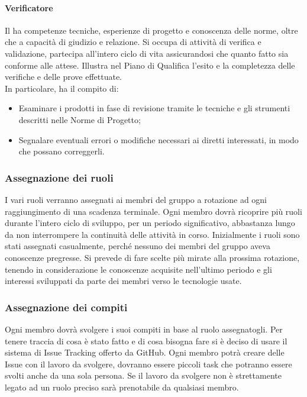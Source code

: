 \documentclass[../norme_di_progetto.tex]{subfiles}
\begin{document}
        \paragraph{Verificatore}
        Il \textbf{} ha competenze tecniche, esperienze di progetto e conoscenza delle norme, oltre che a capacità di giudizio e relazione. Si occupa di attività di verifica e validazione, partecipa all'intero ciclo di vita assicurandosi che quanto fatto sia conforme alle attese. Illustra nel Piano di Qualifica l'esito e la completezza delle verifiche e delle prove effettuate.\\
        In particolare, ha il compito di:
        \begin{itemize}
            \item Esaminare i prodotti in fase di revisione tramite le tecniche e gli strumenti descritti nelle Norme di Progetto;
            \item Segnalare eventuali errori o modifiche necessari ai diretti interessati, in modo che possano correggerli.
        \end{itemize}

    \subsubsection{Assegnazione dei ruoli}
    I vari ruoli verranno assegnati ai membri del gruppo a rotazione ad ogni raggiungimento di una scadenza terminale. Ogni membro dovrà ricoprire più ruoli durante l'intero ciclo di sviluppo, per un periodo significativo, abbastanza lungo da non interrompere la continuità delle attività in corso.
    Inizialmente i ruoli sono stati assegnati casualmente, perché nessuno dei membri del gruppo aveva conoscenze pregresse. Si prevede di fare scelte più mirate alla prossima rotazione, tenendo in considerazione le conoscenze acquisite nell'ultimo periodo e gli interessi sviluppati da parte dei membri verso le tecnologie usate.
    \subsubsection{Assegnazione dei compiti}
    Ogni membro dovrà svolgere i suoi compiti in base al ruolo assegnatogli. Per tenere traccia di cosa è stato fatto e di cosa bisogna fare si è deciso di usare il sistema di Issue Tracking offerto da GitHub. Ogni membro potrà creare delle Issue con il lavoro da svolgere, dovranno essere piccoli task che potranno essere svolti anche da una sola persona. Se il lavoro da svolgere non è strettamente legato ad un ruolo preciso sarà prenotabile da qualsiasi membro.
\end{document}
